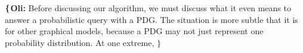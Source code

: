 \documentclass[twoside]{article}
\newcommand\discard[1]{}
\newcommand\voli[1]{{\color{olicolor}\textbf{$\boldsymbol\{$Oli: }#1 \textbf{$\boldsymbol\}$}}}
\begin{document}
\voli{
Before discussing our algorithm, we must discuss what it even means
to answer a probabilistic query with a PDG.
The situation is more subtle that it is for other graphical models, because a PDG may
not just represent one probability distribution.
At one extreme,
}
\end{document}
